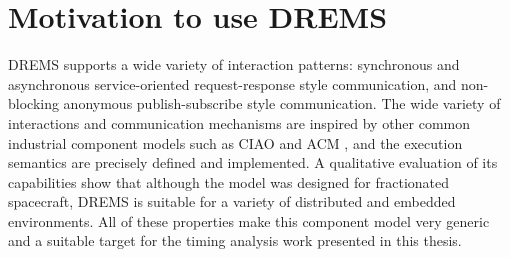 
\section{Motivation to use DREMS}

DREMS supports a wide variety of interaction patterns: synchronous and asynchronous service-oriented request-response style communication, and non-blocking anonymous publish-subscribe style communication. The wide variety of interactions and communication mechanisms are inspired by other common industrial component models such as CIAO \cite{CIAO_Chap:04} and ACM \cite{ACM_SPE:10}, and the execution semantics are precisely defined and implemented. A qualitative evaluation of its capabilities \cite{ISIS_F6_ISORC:13} show that although the model was designed for fractionated spacecraft, DREMS is suitable for a variety of distributed and embedded environments. All of these properties make this component model very generic and a suitable target for the timing analysis work presented in this thesis. 


